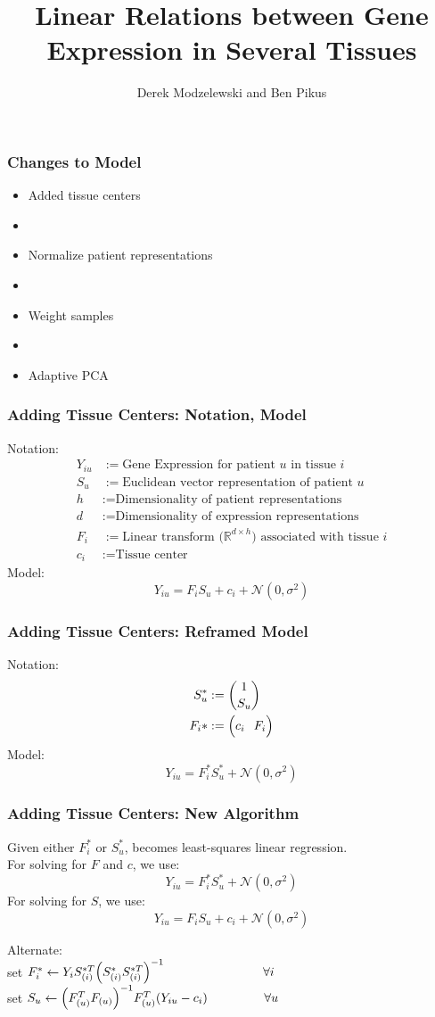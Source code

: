 \documentclass{beamer}
\title{Linear Relations between Gene Expression in Several Tissues}
\author{Derek Modzelewski and Ben Pikus}
\newcommand{\hs}[1]{\hspace*{#1 cm}}
\newcommand{\tx}[1]{\text{#1}}
\begin{document}
\frame{\titlepage}

\begin{frame}
\frametitle{Changes to Model}
\begin{itemize}
	\item Added tissue centers
	\item
	\item Normalize patient representations
	\item	
	\item Weight samples
	\item
	\item Adaptive PCA
\end{itemize}
\end{frame}


\begin{frame}
\frametitle{Adding Tissue Centers: Notation, Model}
Notation:
\begin{align*}
Y_{iu} &:= \tx{Gene Expression for patient $u$ in tissue $i$} \\
S_u &:= \tx{Euclidean vector representation of patient $u$} \\
h &:= \tx{Dimensionality of patient representations} \\
d &:= \tx{Dimensionality of expression representations} \\
F_i &:= \tx{Linear transform ($\mathbb{R}^{d \times h}$) associated with tissue $i$} \\
c_i &:= \tx{Tissue center}
\end{align*}
Model:
\[ Y_{iu} = F_i S_u + c_i + \mathcal{N}(0, \sigma^2) \]
\end{frame}

\begin{frame}
\frametitle{Adding Tissue Centers: Reframed Model}
Notation:
\begin{align*}
S_u^* &:= {1 \choose S_u} \\
F_i* &:= \Big(c_i \hs{.25} F_i\Big) \\
\end{align*}
Model:
\[ Y_{iu} = F_i^* S_u^* + \mathcal{N}(0, \sigma^2) \]
\end{frame}

\begin{frame} \frametitle{Adding Tissue Centers: New Algorithm}
Given either $F_i^*$ or $S_u^*$, becomes least-squares linear regression. \\
For solving for $F$ and $c$, we use:
\[ Y_{iu} = F_i^* S_u^* + \mathcal{N}(0, \sigma^2) \]
For solving for $S$, we use:
\[ Y_{iu} = F_i S_u + c_i + \mathcal{N}(0, \sigma^2) \]

Alternate: \\
\hs{1} set $F_i^* \leftarrow Y_i S_{(i)}^{*T}\Big(S_{(i)}^*S_{(i)}^{*T}\Big)^{-1} \hs{2.8}\forall i$ \\
\hs{1} set $S_u \leftarrow \Big(F_{(u)}^TF_{(u)}\Big)^{-1}F_{(u)}^T (Y_{iu} - c_i) \hs{1.6}\forall u$
\end{frame}
\end{document}
